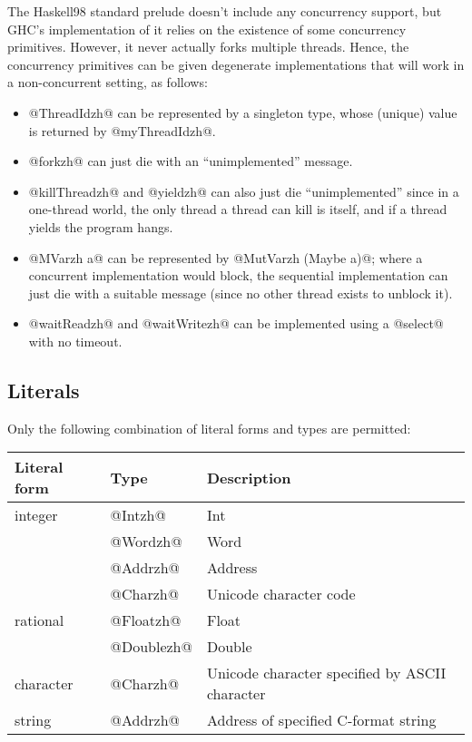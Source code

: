 \documentclass[10pt]{article}
\begin{document}
The Haskell98 standard prelude doesn't include any concurrency support, but GHC's
implementation of it relies on the existence of some concurrency primitives.  However,
it never actually forks multiple threads.  Hence, the concurrency primitives can
be given degenerate implementations that will work in a non-concurrent setting,
as follows:
\begin{itemize}
\item  @ThreadIdzh@ can be represented
by a singleton type, whose (unique) value is returned by @myThreadIdzh@.

\item @forkzh@ can just die with an ``unimplemented'' message.

\item @killThreadzh@ and @yieldzh@ can also just die ``unimplemented'' since
in a one-thread world, the only thread a thread can kill is itself, and
if a thread yields the program hangs.

\item @MVarzh a@ can be represented by @MutVarzh (Maybe a)@;
where a concurrent implementation would block, the sequential implementation can
just die with a suitable message (since no other thread exists to unblock it).

\item @waitReadzh@ and @waitWritezh@ can be implemented using a @select@ with no timeout. 
\end{itemize}

\subsection{Literals}

Only the following combination of literal forms and types are permitted:

\begin{tabular}{|l|l|l|}
\hline
Literal form & Type & Description \\
\hline 
integer	&  @Intzh@ & Int \\
	&  @Wordzh@ & Word \\
	&  @Addrzh@ & Address \\
	&  @Charzh@ & Unicode character code \\
rational & @Floatzh@ & Float \\
	 & @Doublezh@ & Double \\
character & @Charzh@ & Unicode character specified by ASCII character\\
string &  @Addrzh@  & Address of specified C-format string \\
\hline
\end{tabular}
\end{document}
